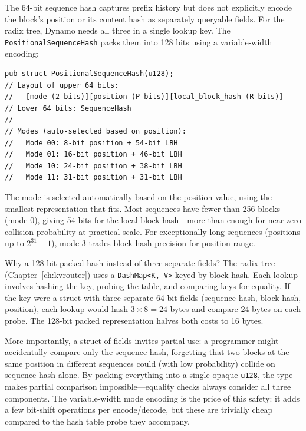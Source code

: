 %
The 64-bit sequence hash captures prefix history but does not explicitly encode the block's position or its content hash as separately queryable fields. For the radix tree, Dynamo needs all three in a single lookup key. The \texttt{PositionalSequenceHash} packs them into 128 bits using a variable-width encoding:

\begin{verbatim}
pub struct PositionalSequenceHash(u128);
// Layout of upper 64 bits:
//   [mode (2 bits)][position (P bits)][local_block_hash (R bits)]
// Lower 64 bits: SequenceHash
//
// Modes (auto-selected based on position):
//   Mode 00: 8-bit position + 54-bit LBH
//   Mode 01: 16-bit position + 46-bit LBH
//   Mode 10: 24-bit position + 38-bit LBH
//   Mode 11: 31-bit position + 31-bit LBH
\end{verbatim}

The mode is selected automatically based on the position value, using the smallest representation that fits. Most sequences have fewer than 256 blocks (mode 0), giving 54 bits for the local block hash---more than enough for near-zero collision probability at practical scale. For exceptionally long sequences (positions up to $2^{31} - 1$), mode 3 trades block hash precision for position range.

\begin{whynotbox}{Why a 128-bit packed hash instead of three separate fields?}
The radix tree (Chapter~\ref{ch:kvrouter}) uses a \texttt{DashMap<K, V>} keyed by block hash. Each lookup involves hashing the key, probing the table, and comparing keys for equality. If the key were a struct with three separate 64-bit fields (sequence hash, block hash, position), each lookup would hash $3 \times 8 = 24$ bytes and compare 24 bytes on each probe. The 128-bit packed representation halves both costs to 16 bytes.

More importantly, a struct-of-fields invites partial use: a programmer might accidentally compare only the sequence hash, forgetting that two blocks at the same position in different sequences could (with low probability) collide on sequence hash alone. By packing everything into a single opaque \texttt{u128}, the type makes partial comparison impossible---equality checks always consider all three components. The variable-width mode encoding is the price of this safety: it adds a few bit-shift operations per encode/decode, but these are trivially cheap compared to the hash table probe they accompany.
\end{whynotbox}

